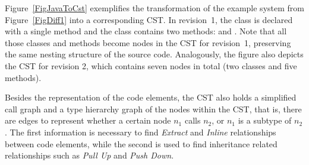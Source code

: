 Figure~\ref{FigJavaToCst} exemplifies the transformation of the example system from Figure~\ref{FigDiff1} into a corresponding CST.
In revision~1, the class  is declared with a single method  and the class  contains two methods:  and .
Note that all those classes and methods become nodes in the CST for revision~1, preserving the same nesting structure of the source code. Analogously, the figure also depicts the CST for revision 2, which contains seven nodes in total (two classes and five methods).

Besides the representation of the code elements, the CST also holds a simplified call graph and  a type hierarchy graph of the nodes within the CST, that is, there are edges to represent whether a certain node $n_1$ calls $n_2$, or $n_1$ is a subtype of $n_2$. The first information is necessary to find \emph{Extract} and \emph{Inline} relationships between code elements, while the second is used to find inheritance related relationships such as \emph{Pull Up} and \emph{Push Down}.

